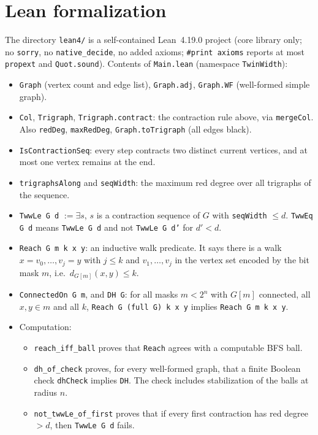 \documentclass[11pt]{article}
\theoremstyle{definition}
\theoremstyle{remark}
\begin{document}
\section{Lean formalization}
The directory \texttt{lean4/} is a self-contained Lean~4.19.0 project (core library only;
no \texttt{sorry}, no \texttt{native\_decide}, no added axioms; \verb|#print axioms|
reports at most \texttt{propext} and \texttt{Quot.sound}). Contents of \texttt{Main.lean}
(namespace \texttt{TwinWidth}):
\begin{itemize}
\item \texttt{Graph} (vertex count and edge list), \texttt{Graph.adj}, \texttt{Graph.WF}
(well-formed simple graph).
\item \texttt{Col}, \texttt{Trigraph}, \texttt{Trigraph.contract}: the contraction rule
above, via \texttt{mergeCol}. Also \texttt{redDeg}, \texttt{maxRedDeg},
\texttt{Graph.toTrigraph} (all edges black).
\item \texttt{IsContractionSeq}: every step contracts two distinct current vertices, and
at most one vertex remains at the end.
\item \texttt{trigraphsAlong} and \texttt{seqWidth}: the maximum red degree over all
trigraphs of the sequence.
\item \texttt{TwwLe G d} $:=\exists s$, $s$ is a contraction sequence of $G$ with
\texttt{seqWidth} $\le d$. \texttt{TwwEq G d} means \texttt{TwwLe G d} and not
\texttt{TwwLe G d'} for $d'<d$.
\item \texttt{Reach G m k x y}: an inductive walk predicate. It says there is a walk
$x=v_0,\dots,v_j=y$ with $j\le k$ and $v_1,\dots,v_j$ in the vertex set encoded by the
bit mask $m$, i.e.\ $d_{G[m]}(x,y)\le k$.
\item \texttt{ConnectedOn G m}, and \texttt{DH G}: for all masks $m<2^n$ with $G[m]$
connected, all $x,y\in m$ and all $k$, \texttt{Reach G (full G) k x y} implies
\texttt{Reach G m k x y}.
\item Computation:
\begin{itemize}
\item \texttt{reach\_iff\_ball} proves that \texttt{Reach} agrees with a computable BFS
ball.
\item \texttt{dh\_of\_check} proves, for every well-formed graph, that a finite Boolean
check \texttt{dhCheck} implies \texttt{DH}. The check includes stabilization of the balls
at radius $n$.
\item \texttt{not\_twwLe\_of\_first} proves that if every first contraction has red degree
$>d$, then \texttt{TwwLe G d} fails.

\end{itemize}
\end{itemize}
\end{document}
